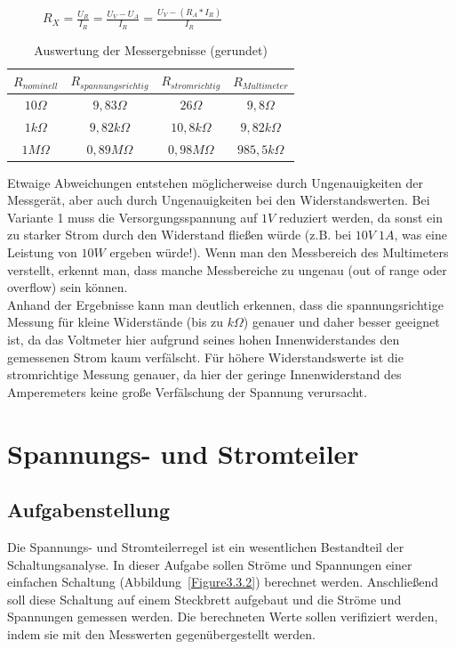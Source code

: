 \documentclass[12pt,a4paper,titlepage]{article}
\begin{document}
\begin{figure}[H]
  \centering
  \label{Figure2.5.6}
  $R_X = \frac{U_R}{I_R} = \frac{U_V-U_A}{I_R} = \frac{U_V-(R_A*I_R)}{I_R}$
\end{figure}

\begin{table}[H]
  \centering
  \label{Figure2.5.7}
  \begin{tabular}{c|c|c|c}
    $R_{nominell}$ & $R_{spannungsrichtig}$ & $R_{stromrichtig}$ & $R_{Multimeter}$ \\
    \hline
    $10\Omega$ & $9,83\Omega$ & $26\Omega$ & $9,8\Omega$ \\
    \hline
    $1k\Omega$ & $9,82k\Omega$ & $10,8k\Omega$ & $9,82k\Omega$ \\
    \hline
    $1M\Omega$ & $0,89M\Omega$ & $0,98M\Omega$ & $985,5k\Omega$
  \end{tabular}
  \caption{Auswertung der Messergebnisse (gerundet)}
\end{table}

\noindent Etwaige Abweichungen entstehen möglicherweise durch Ungenauigkeiten der Messgerät, aber auch durch Ungenauigkeiten bei den Widerstandswerten. Bei Variante 1 muss die Versorgungsspannung auf $1V$ reduziert werden, da sonst ein zu starker Strom durch den Widerstand fließen würde (z.B. bei $10V\;1A$, was eine Leistung von $10W$ ergeben würde!). Wenn man den Messbereich des Multimeters verstellt, erkennt man, dass manche Messbereiche zu ungenau (out of range oder overflow) sein können.\\
Anhand der Ergebnisse kann man deutlich erkennen, dass die spannungsrichtige Messung für kleine Widerstände (bis zu $k\Omega$) genauer und daher besser geeignet ist, da das Voltmeter hier aufgrund seines hohen Innenwiderstandes den gemessenen Strom kaum verfälscht. Für höhere Widerstandswerte ist die stromrichtige Messung genauer, da hier der geringe Innenwiderstand des Amperemeters keine große Verfälschung der Spannung verursacht.



\section{Spannungs- und Stromteiler}

\subsection{Aufgabenstellung}
Die Spannungs- und Stromteilerregel ist ein wesentlichen Bestandteil der Schaltungsanalyse. In dieser Aufgabe sollen Str\"ome und Spannungen einer einfachen Schaltung (Abbildung~\ref{Figure3.3.2}) berechnet werden. Anschlie\ss end soll diese Schaltung auf einem Steckbrett aufgebaut und die Str\"ome und Spannungen gemessen werden. Die berechneten Werte sollen verifiziert werden, indem sie mit den Messwerten gegen\"ubergestellt werden.
\end{document}
